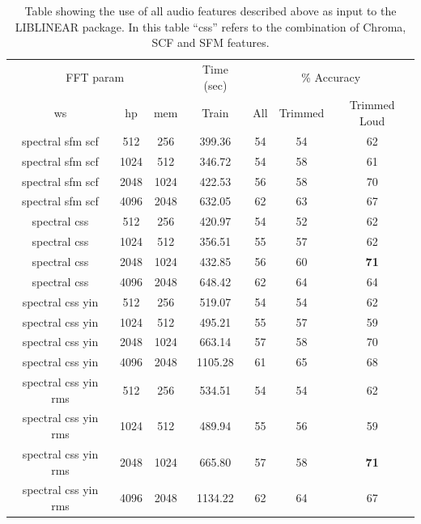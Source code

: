 \begin{table}
\begin{tabular}{|c|c|c|c|c|c|c|}
\hline
\multicolumn{3}{|c|}{FFT param} & \multicolumn{1}{c|}{Time (sec)} & \multicolumn{3}{c|}{\% Accuracy} \\
\hhline{|-|-|-|-|-|-|-|}
ws & hp & mem & Train & All & Trimmed & Trimmed Loud \\
\hhline{|=|=|=|=|=|=|=|}
spectral sfm scf & 512 & 256         &   399.36  &    54 & 54 & 62 \\
spectral sfm scf & 1024 & 512        &   346.72  &    54 & 58 & 61 \\
spectral sfm scf & 2048 & 1024       &   422.53  &    56 & 58 & 70 \\
spectral sfm scf & 4096 & 2048       &   632.05  &    62 & 63 & 67 \\
\hline
spectral css & 512 & 256             &   420.97  &    54 & 52 & 62 \\
spectral css & 1024 & 512   		 &   356.51  &    55 & 57 & 62 \\
spectral css & 2048 & 1024           &   432.85  &    56 & 60 & \textbf{71} \\
spectral css & 4096 & 2048           &   648.42  &    62 & 64 & 64 \\
\hline
spectral css yin & 512 & 256         &   519.07  &    54 & 54 & 62 \\
spectral css yin & 1024 & 512        &   495.21  &    55 & 57 & 59 \\
spectral css yin & 2048 & 1024       &   663.14  &    57 & 58 & 70 \\
spectral css yin & 4096 & 2048       &  1105.28  &    61 & 65 & 68 \\
\hline
spectral css yin rms & 512 & 256     &   534.51  &    54 & 54 & 62 \\
spectral css yin rms & 1024 & 512    &   489.94  &    55 & 56 & 59 \\
spectral css yin rms & 2048 & 1024   &   665.80  &    57 & 58 & \textbf{71} \\
spectral css yin rms & 4096 & 2048   &  1134.22  &    62 & 64 & 67\\
\hline
\end{tabular}
\caption{Table showing the use of all audio features
  described above as input to the LIBLINEAR package.  In this table
  ``css'' refers to the combination of Chroma, SCF and SFM features.}
\label{table:calls-different-all}
\end{table}

